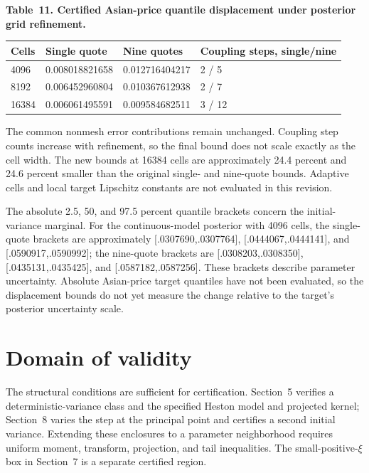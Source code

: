 \documentclass[11pt,a4paper]{article}
\begin{document}
\noindent\textbf{Table~11. Certified Asian-price quantile displacement under posterior grid refinement.}
\begin{center}
\begin{tabularx}{\textwidth}{@{}l X X X@{}}
\toprule
Cells & Single quote & Nine quotes & Coupling steps, single/nine \\
\midrule
4096 & 0.008018821658 & 0.012716404217 & 2 / 5 \\
8192 & 0.006452960804 & 0.010367612938 & 2 / 7 \\
16384 & 0.006061495591 & 0.009584682511 & 3 / 12 \\
\bottomrule
\end{tabularx}
\end{center}

The common nonmesh error contributions remain unchanged. Coupling step counts increase with
refinement, so the final bound does not scale exactly as the cell width. The
new bounds at 16384 cells are approximately 24.4 percent and 24.6 percent smaller
than the original single- and nine-quote bounds. Adaptive cells and local target
Lipschitz constants are not evaluated in this revision.

The absolute 2.5, 50, and 97.5 percent quantile brackets concern the
initial-variance marginal. For the continuous-model posterior with
4096 cells, the single-quote brackets are approximately
[.0307690,.0307764], [.0444067,.0444141], and [.0590917,.0590992]; the nine-quote
brackets are [.0308203,.0308350], [.0435131,.0435425], and [.0587182,.0587256].
These brackets describe parameter uncertainty. Absolute Asian-price target
quantiles have not been evaluated, so the displacement bounds do not yet
measure the change relative to the target's posterior uncertainty scale.


\section{Domain of validity}

The structural conditions are sufficient for certification. Section~5 verifies
a deterministic-variance class and the specified Heston model and projected
kernel; Section~8 varies the step at the principal point and certifies
a second initial variance. Extending these
enclosures to a parameter neighborhood requires uniform moment, transform,
projection, and tail inequalities. The small-positive-\(\xi\) box in Section~7
is a separate certified region.
\end{document}
